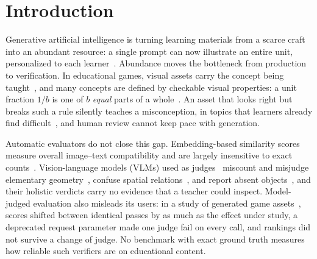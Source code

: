 \documentclass[conference]{IEEEtran}
\begin{document}
\section{Introduction}



Generative artificial intelligence is turning learning materials from a scarce craft into an abundant resource: a single prompt can now illustrate an entire unit, personalized to each learner~\cite{kasneci2023chatgpt}. Abundance moves the bottleneck from production to verification. In educational games, visual assets carry the concept being taught~\cite{plass2015foundations}, and many concepts are defined by checkable visual properties: a unit fraction $1/b$ is one of $b$ \emph{equal} parts of a whole~\cite{ccss2010math}. An asset that looks right but breaks such a rule silently teaches a misconception, in topics that learners already find difficult~\cite{siegler2013fractions}, and human review cannot keep pace with generation.

Automatic evaluators do not close this gap. Embedding-based similarity scores~\cite{hessel2021clipscore} measure overall image--text compatibility and are largely insensitive to exact counts~\cite{paiss2023count}. Vision-language models (VLMs) used as judges~\cite{zheng2023judging,chen2024mllmjudge} miscount and misjudge elementary geometry~\cite{rahmanzadehgervi2024blind}, confuse spatial relations~\cite{kamath2023whatsup}, and report absent objects~\cite{li2023pope}, and their holistic verdicts carry no evidence that a teacher could inspect. Model-judged evaluation also misleads its users: in a study of generated game assets~\cite{anon2026legibility}, scores shifted between identical passes by as much as the effect under study, a deprecated request parameter made one judge fail on every call, and rankings did not survive a change of judge. No benchmark with exact ground truth measures how reliable such verifiers are on educational content.
\end{document}
